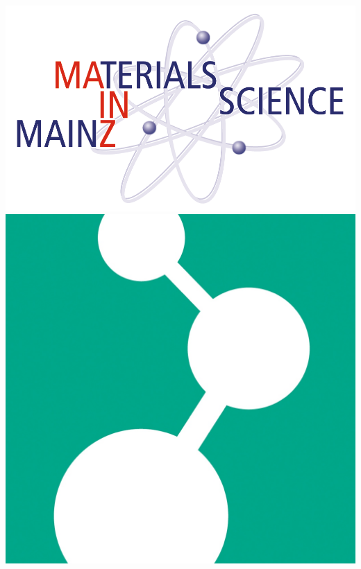 \documentclass[paper=a4,fontsize=12pt,open=right,noabbrev]{nadisser}[2018/07/09]
\begin{document}
\renewcommand{\thepage}{}




\maketitle

\cleardoublepage

% 

\cleardoublepage 


\begin{center}
\hspace*{1.5cm}
 \includegraphics[scale = 0.14]{images/Transparent-Logo_Material_Science_Mz.png}
\hspace*{\fill}
 \includegraphics[scale = 0.06]{images/mpip.jpg}
\hspace*{1.5cm} 
 \end{center}
\end{document}
